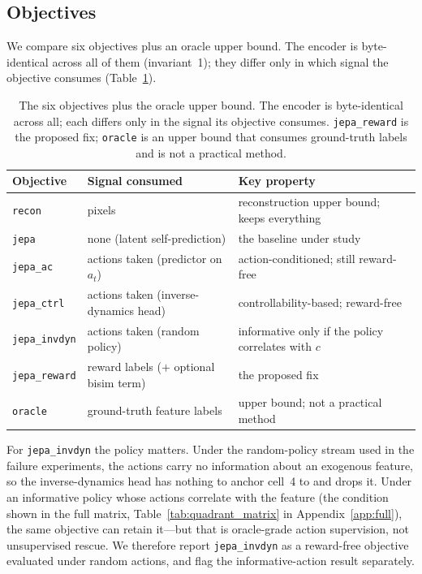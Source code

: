 \documentclass[11pt]{article}
\begin{document}
\subsection{Objectives}
\label{sec:objectives}
We compare six objectives plus an oracle upper bound. The encoder is byte-identical across all of
them (invariant~1); they differ only in which signal the objective consumes
(Table~\ref{tab:objectives}).

\begin{table}[t]
\centering
\caption{The six objectives plus the oracle upper bound. The encoder is byte-identical across all;
each differs only in the signal its objective consumes. \texttt{jepa\_reward} is the proposed fix;
\texttt{oracle} is an upper bound that consumes ground-truth labels and is not a practical method.}
\label{tab:objectives}
\begin{tabular}{ll>{\raggedright\arraybackslash}p{5.6cm}}
\toprule
\textbf{Objective} & \textbf{Signal consumed} & \textbf{Key property} \\
\midrule
\texttt{recon}        & pixels                                   & reconstruction upper bound; keeps everything \\
\texttt{jepa}         & none (latent self-prediction)            & the baseline under study \\
\texttt{jepa\_ac}     & actions taken (predictor on $a_t$)       & action-conditioned; still reward-free \\
\texttt{jepa\_ctrl}   & actions taken (inverse-dynamics head)    & controllability-based; reward-free \\
\texttt{jepa\_invdyn} & actions taken (random policy)            & informative only if the policy correlates with $c$ \\
\texttt{jepa\_reward} & reward labels ($+$ optional bisim term)  & the proposed fix \\
\texttt{oracle}       & ground-truth feature labels              & upper bound; not a practical method \\
\bottomrule
\end{tabular}
\end{table}

For \texttt{jepa\_invdyn} the policy matters. Under the random-policy stream used in the failure
experiments, the actions carry no information about an exogenous feature, so the inverse-dynamics
head has nothing to anchor cell~4 to and drops it. Under an informative policy whose actions
correlate with the feature (the condition shown in the full matrix, Table~\ref{tab:quadrant_matrix}
in Appendix~\ref{app:full}), the same objective can retain it---but that is oracle-grade action
supervision, not unsupervised rescue. We therefore report \texttt{jepa\_invdyn} as a reward-free
objective evaluated under random actions, and flag the informative-action result separately.
\end{document}
